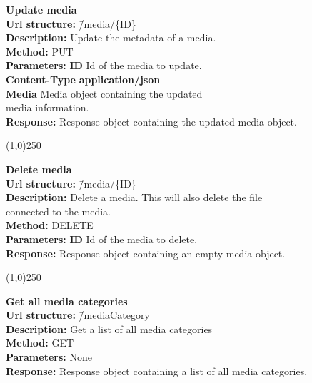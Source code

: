 \documentclass[11pt]{article}
\begin{document}
\begin{tabbing}
\textbf{Update media} \\
\textcolor{black!60}{\textbf{Url structure:}} \hspace{0.2in} \= /media/\{ID\} \\
\textcolor{black!60}{\textbf{Description:}}  \> Update the metadata of a media. \\
\textcolor{black!60}{\textbf{Method:}} \> PUT \\
\textcolor{black!60}{\textbf{Parameters:}} \> \textbf{ID} Id of the media to update. \\
\textcolor{black!60}{\textbf{Content-Type}} \> \textbf{application/json} \\
\> \textbf{Media} Media object containing the updated 
\\ \> media information. \\
\textcolor{black!60}{\textbf{Response:}} \> Response object containing the updated media object.
\end{tabbing}

\begin{center}\line(1,0){250}\end{center}

\begin{tabbing}
\textbf{Delete media} \\
\textcolor{black!60}{\textbf{Url structure:}} \hspace{0.2in} \= /media/\{ID\} \\
\textcolor{black!60}{\textbf{Description:}}  \> Delete a media. This will also delete the file 
\\ \> connected to the media. \\
\textcolor{black!60}{\textbf{Method:}} \> DELETE \\
\textcolor{black!60}{\textbf{Parameters:}} \> \textbf{ID} Id of the media to delete. \\
\textcolor{black!60}{\textbf{Response:}} \> Response object containing an empty media object.
\end{tabbing}

\begin{center}\line(1,0){250}\end{center}

\begin{tabbing}
\textbf{Get all media categories} \\
\textcolor{black!60}{\textbf{Url structure:}} \hspace{0.2in} \= /mediaCategory \\
\textcolor{black!60}{\textbf{Description:}}  \> Get a list of all media categories \\
\textcolor{black!60}{\textbf{Method:}} \> GET \\
\textcolor{black!60}{\textbf{Parameters:}} \> None \\
\textcolor{black!60}{\textbf{Response:}} \> Response object containing a list of all media categories.
\end{tabbing}
\end{document}

